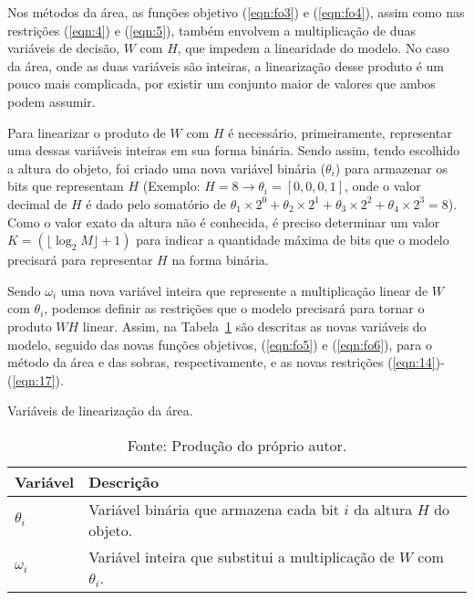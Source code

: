         Nos métodos da área, as funções objetivo (\ref{eqn:fo3}) e (\ref{eqn:fo4}), assim como nas restrições (\ref{eqn:4}) e (\ref{eqn:5}), também envolvem a multiplicação de duas variáveis de decisão, $W$ com $H$, que impedem a linearidade do modelo. No caso da área, onde as duas variáveis são inteiras, a linearização desse produto é um pouco mais complicada, por existir um conjunto maior de valores que ambos podem assumir.

        Para linearizar o produto de $W$ com $H$ é necessário, primeiramente, representar uma dessas variáveis inteiras em sua forma binária. Sendo assim, tendo escolhido a altura do objeto, foi criado uma nova variável binária ($\theta_i$) para armazenar os bits que representam $H$ (Exemplo: $H = 8 \rightarrow \theta_i = [0, 0, 0, 1]$, onde o valor decimal de $H$ é dado pelo somatório de $\theta_{1}\times2^0 + \theta_{2}\times2^1 + \theta_{3}\times2^2 + \theta_{4}\times2^3 = 8 $). Como o valor exato da altura não é conhecida, é preciso determinar um valor $K = (\lfloor \log_2 {M} \rfloor + 1)$ para indicar a quantidade máxima de bits que o modelo precisará para representar $H$ na forma binária.
    
        Sendo $\omega_i$ uma nova variável inteira que represente a multiplicação linear de $W$ com $\theta_i$, podemos definir as restrições que o modelo precisará para tornar o produto $W H$ linear. Assim, na Tabela~\ref{Tab-Variaveis-de-decisao-area} são descritas as novas variáveis do modelo, seguido das novas funções objetivos, (\ref{eqn:fo5}) e (\ref{eqn:fo6}), para o método da área e das sobras, respectivamente, e as novas restrições (\ref{eqn:14})-(\ref{eqn:17}).

        \begin{table}[htbp]
            \renewcommand{\arraystretch}{1.2}   %
            \centering
            \footnotesize
            \caption{Variáveis de linearização da área.} %
            \begin{tabular}{ l p{11cm}}
                \hline
                \textbf{Variável}   &   \textbf{Descrição}  \\
                \hline
                ${\theta}_i$    &   Variável binária que armazena cada bit $i$ da altura $H$ do objeto.     \\
                ${\omega}_i$    &   Variável inteira que substitui a multiplicação de $W$ com $\theta_i$.   \\
                \hline
            \end{tabular}
            \caption*{Fonte: Produção do próprio autor.}    %
            \label{Tab-Variaveis-de-decisao-area}
        \end{table}

